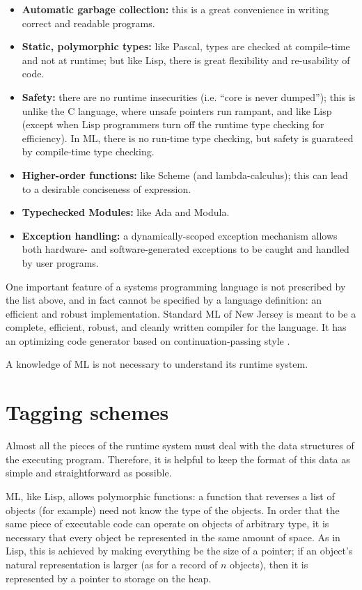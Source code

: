 \begin{itemize}
\item {\bf Automatic garbage collection:} this is a great convenience in
writing correct and readable programs.
\item {\bf Static, polymorphic types:}  like Pascal, types are checked
at compile-time and not at runtime; but like Lisp, there is great flexibility
and re-usability of code.
\item {\bf Safety:} there are no runtime insecurities (i.e. ``core is never
dumped''); this is unlike the C language, where unsafe pointers run
rampant, and like Lisp (except when Lisp programmers turn off the runtime
type checking for efficiency).  In ML, there is no run-time type checking,
but safety is guarateed by compile-time type checking.
\item {\bf Higher-order functions:} like Scheme (and lambda-calculus); this
can lead to a desirable conciseness of expression.
\item {\bf Typechecked Modules:} like Ada and Modula.
\item {\bf Exception handling:} a dynamically-scoped exception
mechanism allows both hardware- and software-generated exceptions
to be caught and handled by user programs.
\end{itemize}

One important feature of a systems programming language
is not prescribed by the list above, and in fact cannot be specified
by a language definition: an efficient and robust implementation.
Standard ML of New Jersey\cite{appel87:sml} is meant to be a complete,
efficient, robust, and cleanly written compiler for the language.
It has an optimizing code generator based on continuation-passing style
\cite{appel89:cps}.

A knowledge of ML is not necessary to understand its runtime system.

\section{Tagging schemes}
\label{tagging}

Almost all the pieces of the runtime system must deal with the data structures
of the executing program.  Therefore, it is helpful to keep the format of
this data as simple and straightforward as possible.

ML, like Lisp, allows polymorphic functions: a function that reverses a list
of objects (for example) need not know the type of the objects.  In order that
the same piece of executable code can operate on objects of arbitrary type,
it is necessary that every object be represented in the same amount of space.
As in Lisp, this is achieved by making everything be the size of a pointer;
if an object's natural representation is larger (as for a record of $n$
objects), then it is represented by a pointer to storage on the heap.

